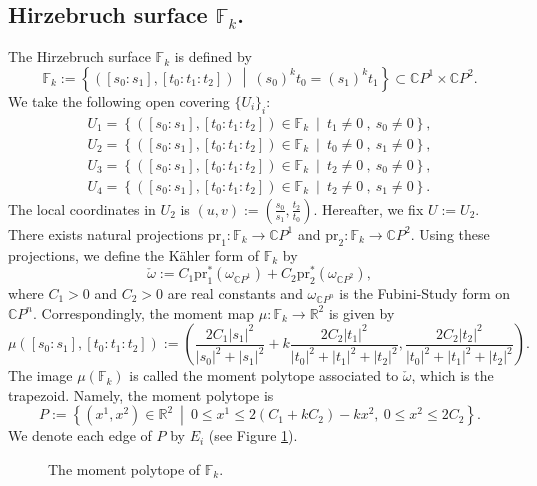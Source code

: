 \documentclass[12pt,reqno]{amsart}
\newcommand{\R}{{\mathbb{R}}}
\newcommand{\C}{{\mathbb{C}}}
\newcommand{\F}{{\mathbb{F}}}
\newcommand{\Fk}{{\F_k}}
\newcommand{\pr}{{\mathrm{pr}}}
\theoremstyle{definition}
\begin{document}
\subsection{Hirzebruch surface $\Fk$.}\label{Fk}
The Hirzebruch surface $\Fk$ is defined by
\begin{equation*}
\Fk :=\left\{ ([s_0:s_1],[t_0:t_1:t_2])\ \middle|\ (s_0)^kt_0=(s_1)^kt_1 \right\} \subset \C P^1\times\C P^2.
\end{equation*}
We take the following open covering $\{U_i\}_i$: 
\begin{align*}
U_1  =  \left\{([s_0:s_1],[t_0:t_1:t_2]) \in \Fk\ \middle|\ t_1 \neq 0\ ,\ s_0 \neq 0\right\},\\
U_2  =  \left\{([s_0:s_1],[t_0:t_1:t_2]) \in \Fk\ \middle|\ t_0 \neq 0\ ,\ s_1 \neq 0\right\},\\
U_3  =  \left\{([s_0:s_1],[t_0:t_1:t_2]) \in \Fk\ \middle|\ t_2 \neq 0\ ,\ s_0 \neq 0\right\},\\
U_4  =  \left\{([s_0:s_1],[t_0:t_1:t_2]) \in \Fk\ \middle|\ t_2 \neq 0\ ,\ s_1 \neq 0\right\}.
\end{align*}
The local coordinates in $U_2$ is $(u,v) := \left(\frac{s_0}{s_1},\frac{t_2}{t_0}\right)$. Hereafter, we fix $U:=U_2$.
There exists natural projections $\pr_1:\Fk\to\C P^1$ and $\pr_2:\Fk\to\C P^2$.
Using these projections, we define the K\"ahler form of $\Fk$ by
\begin{equation*}
\check{\omega}:= C_1\pr_1^*\left(\omega_{\C P^1}\right) + C_2\pr_2^*\left(\omega_{\C P^2}\right),
\end{equation*}
where $C_1 > 0$ and $C_2 > 0$ are real constants and $\omega_{\C P^n}$ is the Fubini-Study form on $\C P^n$. Correspondingly, the moment map $\mu:\Fk\to \R^2$ is given by
\begin{equation*}
\mu([s_0:s_1],[t_0:t_1:t_2]) :=\left(\frac{2C_1|s_1|^2}{|s_0|^2+|s_1|^2}+k\frac{2C_2|t_1|^2}{|t_0|^2+|t_1|^2+|t_2|^2}, \frac{2C_2|t_2|^2}{|t_0|^2+|t_1|^2+|t_2|^2}\right).
\end{equation*}
The image $\mu(\Fk)$ is called the moment polytope associated to $\check{\omega}$, which is the trapezoid. Namely, the moment polytope is
\begin{equation*}
P:=\left\{(x^1,x^2)\in\R^2\ \middle|\ 0\leq x^1 \leq 2(C_1+kC_2)-kx^2,\ 0\leq x^2 \leq 2C_2\right\}.
\end{equation*}
We denote each edge of $P$ by $E_i$  (see Figure \ref{poly1}).

\begin{figure}[h]
\center
{}
\caption{The moment polytope of $\Fk$.}
\label{poly1}
\end{figure}
\end{document}
